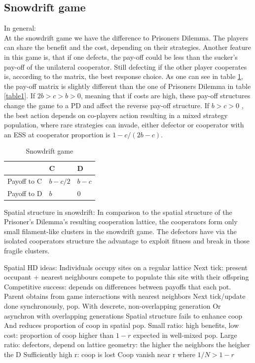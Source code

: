\documentclass[DIV=calc, paper=a4, fontsize=11pt, twocolumn]{scrartcl}	 %
\begin{document}
\subsection*{Snowdrift game}

In general: \\
At the snowdrift game we have the difference to Prisoners Dilemma. The players can share the benefit and the cost, depending on their strategies. Another feature in this game is, that if one defects, the pay-off could be less than the sucker's pay-off of the unilateral cooperator. Still defecting if the other player cooperates is, according to the matrix, the best response choice. As one can see in table \ref{table2}, the pay-off matrix is slightly different than the one of Prisoners Dilemma in table \ref{table1}. 
If $2b > c > b > 0$, meaning that if costs are high, these pay-off structures change the game to a PD and affect the reverse pay-off structure. If $b > c > 0$ , the best action depends on co-players action resulting in a mixed strategy population, where rare strategies can invade, either defector or cooperator with an ESS at cooperator proportion is $1- c/(2b-c)$. 


\begin{table}[h]
\caption{Snowdrift game}
\label{table2}
\centering
\begin{tabular}{lll}
 & C & D \\
\midrule
Payoff to C & $b-c/2$ & $b-c$ \\
Payoff to D & $b$ & $0$ \\
\bottomrule
\end{tabular}
\end{table}

Spatial structure in snowdrift: 
In comparison to the spatial structure  of the Prisoner's Dilemma's resulting cooperation lattice, the cooperators form only small filament-like clusters in the snowdrift game. The defectors have via the isolated cooperators structure the advantage to exploit fitness and break in those fragile clusters.

Spatial HD ideas: 
	Individuals occupy sites on a regular lattice
	Next tick: present occupant + nearest neighbours compete to populate this site with their offspring
	Competitive success: depends on differences between payoffs that each pot. Parent obtains from game interactions with nearest neighbors
	Next tick/update done synchronously, pop. With descrete, non-overlapping generation
	Or asynchron with overlapping generations 
	Spatial structure fails to enhance coop
 	And reduces proportion of coop in spatial pop. 
Small ratio: high benefits, low cost: proportion of coop higher than $1-r$ expected in well-mixed pop.
Large ratio: defectors, depend on lattice geometry: the higher the neighbors the heigher the D
Sufficiently high r: coop is lost 
Coop vanish near r where $ 1/N > 1- r$
\end{document}
